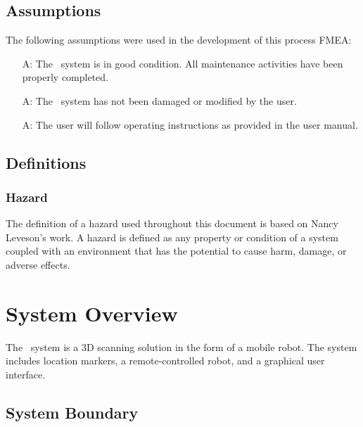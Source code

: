 \documentclass[12pt]{article}
\newcounter{assumpnum} %
\begin{document}
\subsection{Assumptions}

The following assumptions were used in the development of this process FMEA:

\noindent \begin{itemize}
\item[A\refstepcounter{assumpnum}\theassumpnum \label{Assumption1}:] The \progname ~system is in good condition. All maintenance activities have been properly completed. 

\item[A\refstepcounter{assumpnum}\theassumpnum \label{Assumption2}:]The \progname ~system has not been damaged or modified by the user.

\item[A\refstepcounter{assumpnum}\theassumpnum \label{Assumption3}:] The user will follow operating instructions as provided in the user manual.

\end{itemize}

\subsection{Definitions}

\subsubsection{Hazard}

The definition of a hazard used throughout this document is based on  Nancy Leveson's work. A hazard is defined as any property or condition of a system coupled with an environment that has the potential to cause harm, damage, or adverse effects.

\section{System Overview}

The \progname ~system is a 3D scanning solution in the form of a mobile robot. The system includes location markers, a remote-controlled robot, and a graphical user interface.

\subsection{System Boundary}
\end{document}
